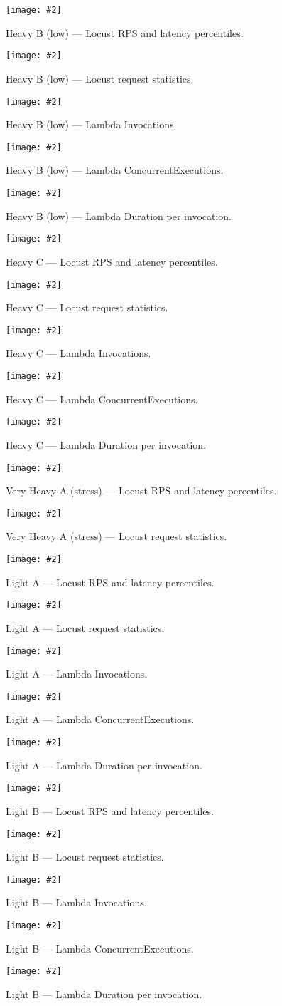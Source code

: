 \documentclass[11pt,a4paper]{article}
\makeatletter
\newcommand{\scenariofig}[4][\linewidth]{%
  \begin{figure}[htbp]
    \centering
    \texttt{[image: \#2]}
    \caption{#3}
    \label{#4}
  \end{figure}%
}
\let\orig@includegraphics\includegraphics
\renewcommand{\includegraphics}[2][]{%
  \begingroup
    \def\imgfile{#2}%
    \IfSubStr{\imgfile}{Charts}{%
      \orig@includegraphics[width=.55\linewidth]{#2}%
    }{%
      \IfSubStr{\imgfile}{Stats}{%
        \orig@includegraphics[width=.45\linewidth]{#2}%
      }{%
        \IfSubStr{\imgfile}{Duration}{%
          \orig@includegraphics[width=.70\linewidth]{#2}%
        }{%
          \IfSubStr{\imgfile}{Invocation}{%
            \orig@includegraphics[width=.70\linewidth]{#2}%
          }{%
            \IfSubStr{\imgfile}{Invocations}{%
              \orig@includegraphics[width=.70\linewidth]{#2}%
            }{%
              \IfSubStr{\imgfile}{Concurrent}{%
                \orig@includegraphics[width=.70\linewidth]{#2}%
              }{%
                \IfSubStr{\imgfile}{ConcEx}{%
                  \orig@includegraphics[width=.70\linewidth]{#2}%
                }{%
                  \orig@includegraphics[width=\linewidth]{#2}%
                }%
              }%
            }%
          }%
        }%
      }%
    }%
  \endgroup
}
\makeatother
\begin{document}
\scenariofig{figures/hBl - Charts.png}{Heavy B (low) — Locust RPS and latency percentiles.}{fig:hbl-charts}
\scenariofig{figures/hBl - Stats.png}{Heavy B (low) — Locust request statistics.}{fig:hbl-stats}
\scenariofig{figures/hBl - Invocations.png}{Heavy B (low) — Lambda Invocations.}{fig:hbl-invocations}
\scenariofig{figures/hBl - ConcEx.png}{Heavy B (low) — Lambda ConcurrentExecutions.}{fig:hbl-conc}
\scenariofig{figures/hBl - Duration.png}{Heavy B (low) — Lambda Duration per invocation.}{fig:hbl-duration}

\scenariofig{figures/hC - Charts.png}{Heavy C — Locust RPS and latency percentiles.}{fig:hc-charts}
\scenariofig{figures/hC - Stats.png}{Heavy C — Locust request statistics.}{fig:hc-stats}
\scenariofig{figures/hC - Invocations.png}{Heavy C — Lambda Invocations.}{fig:hc-invocations}
\scenariofig{figures/hC - ConcEx.png}{Heavy C — Lambda ConcurrentExecutions.}{fig:hc-conc}
\scenariofig{figures/hC - Duration.png}{Heavy C — Lambda Duration per invocation.}{fig:hc-duration}

\scenariofig{figures/hhA - Charts.png}{Very Heavy A (stress) — Locust RPS and latency percentiles.}{fig:hha-charts}
\scenariofig{figures/hhA - Stats.png}{Very Heavy A (stress) — Locust request statistics.}{fig:hha-stats}


\scenariofig{figures/lA - Charts.png}{Light A — Locust RPS and latency percentiles.}{fig:la-charts}
\scenariofig{figures/lA - Stats.png}{Light A — Locust request statistics.}{fig:la-stats}
\scenariofig{figures/lA - Invocations.png}{Light A — Lambda Invocations.}{fig:la-invocations}
\scenariofig{figures/lA - ConcExecutions.png}{Light A — Lambda ConcurrentExecutions.}{fig:la-conc}
\scenariofig{figures/lA - Duration.png}{Light A — Lambda Duration per invocation.}{fig:la-duration}

\scenariofig{figures/lB - Charts.png}{Light B — Locust RPS and latency percentiles.}{fig:lb-charts}
\scenariofig{figures/lB - Stats.png}{Light B — Locust request statistics.}{fig:lb-stats}
\scenariofig{figures/lB - Invocations.png}{Light B — Lambda Invocations.}{fig:lb-invocations}
\scenariofig{figures/lB - ConcEx.png}{Light B — Lambda ConcurrentExecutions.}{fig:lb-conc}
\scenariofig{figures/lB - Duration.png}{Light B — Lambda Duration per invocation.}{fig:lb-duration}
\end{document}
